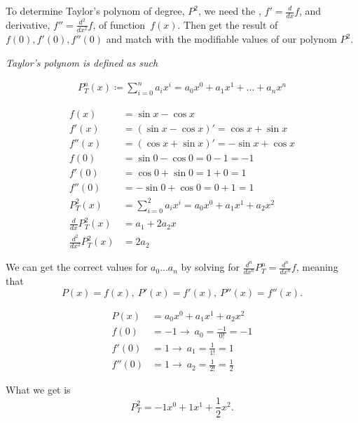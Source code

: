 To determine Taylor's polynom of  degree, $P^{2}$, we need
the , $f' = \frac{d}{dx}f$, and  derivative, 
$f'' = \frac{d^2}{dx^2}f$, of function~$f(x)$. Then 
get the result of $f(0), f'(0), f''(0)$ and match 
with the modifiable values of our polynom $P^{2}$.

\begin{center}
    \textit{Taylor's polynom is defined as such} 
\end{center}
\begin{align*}
    P_{T}^{n}(x) \coloneq \sum_{i = 0}^{n} a_{i}x^{i} 
    = a_{0}x^{0} + a_{1}x^{1} + \ldots + a_{n}x^{n}
\end{align*}

\begin{align}
    f(x) &= \sin{x} - \cos{x} \\
    f'(x) &= \left( \sin{x} - \cos{x} \right)' 
    = \cos{x} + \sin{x} \\
    f''(x) &= \left( \cos{x} + \sin{x} \right)'
    = -\sin{x} + \cos{x} \\
    f(0) &= \sin{0} - \cos{0} = 0 - 1 = -1 \\
    f'(0) &= \cos{0} + \sin{0} = 1 + 0 = 1 \\
    f''(0) &= -\sin{0} + \cos{0} = 0 + 1 = 1 \\
    P_{T}^{2}(x) &= \sum_{i = 0}^{2} a_{i}x^{i} 
    = a_{0}x^{0} + a_{1}x^{1} + a_{2}x^{2} \\ 
    \frac{d}{dx}P_{T}^{2}(x) &= a_{1} + 2a_{2}x \\
    \frac{d^{2}}{dx^{2}}P_{T}^{2}(x) &= 2a_{2}
\end{align}

We can get the correct values for $a_{0} \ldots a_{n}$
by solving for $\frac{d^{n}}{dx^{n}}P_{T}^{n} = \frac{d^{n}}{dx^{n}}f$, 
meaning that 
    $$P(x) = f(x),\ P'(x) = f'(x),\ P''(x) = f''(x).$$

\begin{align}
    P(x) &= a_{0}x^{0} + a_{1}x^{1} + a_{2}x^{2} \\
    f(0) &= -1 \rightarrow\ a_{0} = \frac{-1}{0!} = -1 \\
    f'(0) &= 1 \rightarrow\ a_{1} = \frac{1}{1!} = 1 \\
    f''(0) &= 1 \rightarrow\ a_{2} = \frac{1}{2!} = \frac{1}{2}
\end{align}

What we get is
$$ P_{T}^{2} = -1x^{0} + 1x^{1} + \frac{1}{2}x^{2}. $$

\pagebreak

